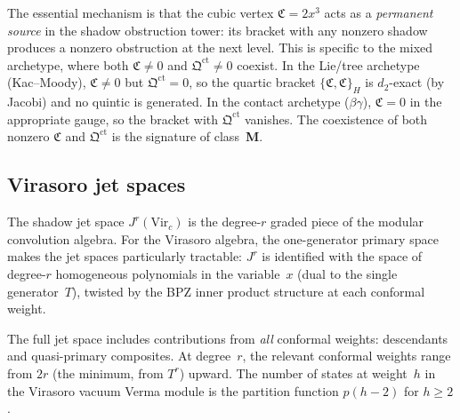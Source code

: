 \begin{remark}
The essential mechanism is that the cubic vertex
$\mathfrak{C} = 2x^3$ acts as a \emph{permanent source}
in the shadow obstruction tower: its bracket with any nonzero shadow
produces a nonzero obstruction at the next level. This
is specific to the mixed archetype, where both
$\mathfrak{C} \neq 0$ and $\mathfrak{Q}^{\mathrm{ct}}
\neq 0$ coexist. In the Lie/tree archetype (Kac--Moody),
$\mathfrak{C} \neq 0$ but $\mathfrak{Q}^{\mathrm{ct}} = 0$,
so the quartic bracket $\{\mathfrak{C}, \mathfrak{C}\}_H$
is $d_2$-exact (by Jacobi) and no quintic is generated.
In the contact archetype ($\beta\gamma$),
$\mathfrak{C} = 0$ in the appropriate gauge, so the
bracket with $\mathfrak{Q}^{\mathrm{ct}}$ vanishes.
The coexistence of both nonzero $\mathfrak{C}$ and
$\mathfrak{Q}^{\mathrm{ct}}$ is the signature of
class~\textbf{M}.
\end{remark}


\subsection{Virasoro jet spaces}

The shadow jet space $J^r(\mathrm{Vir}_c)$ is the
degree-$r$ graded piece of the modular convolution algebra.
For the Virasoro algebra, the one-generator primary space
makes the jet spaces particularly tractable: $J^r$ is
identified with the space of degree-$r$ homogeneous
polynomials in the variable~$x$ (dual to the single
generator~$T$), twisted by the BPZ inner product
structure at each conformal weight.

The full jet space includes contributions from
\emph{all} conformal weights: descendants and
quasi-primary composites. At degree~$r$, the relevant
conformal weights range from $2r$ (the minimum, from
$T^r$) upward. The number of states at weight~$h$
in the Virasoro vacuum Verma module is the
partition function $p(h - 2)$ for $h \geq 2$.

